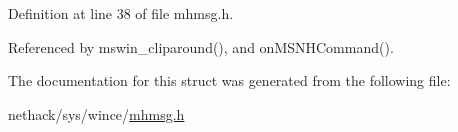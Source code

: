 Definition at line 38 of file mhmsg.\+h.



Referenced by mswin\+\_\+cliparound(), and on\+M\+S\+N\+H\+Command().



The documentation for this struct was generated from the following file\+:\begin{DoxyCompactItemize}
\item 
nethack/sys/wince/\hyperlink{sys_2wince_2mhmsg_8h}{mhmsg.\+h}\end{DoxyCompactItemize}
